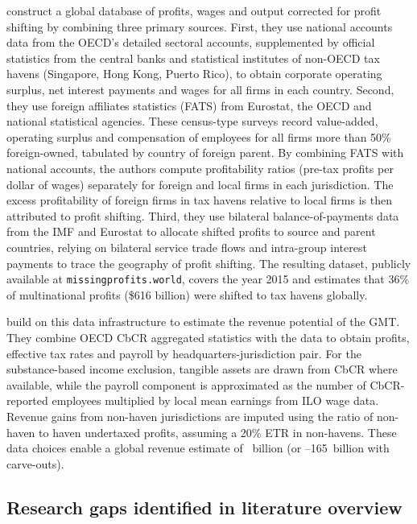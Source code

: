 \documentclass[11pt,a4paper]{article}
\newcommand{\EUR}{\texteuro}
\begin{document}
\citet{torslov2023} construct a global database of profits, wages and output corrected for profit shifting by combining three primary sources. First, they use national accounts data from the OECD's detailed sectoral accounts, supplemented by official statistics from the central banks and statistical institutes of non-OECD tax havens (Singapore, Hong Kong, Puerto Rico), to obtain corporate operating surplus, net interest payments and wages for all firms in each country. Second, they use foreign affiliates statistics (FATS) from Eurostat, the OECD and national statistical agencies. These census-type surveys record value-added, operating surplus and compensation of employees for all firms more than 50\% foreign-owned, tabulated by country of foreign parent. By combining FATS with national accounts, the authors compute profitability ratios (pre-tax profits per dollar of wages) separately for foreign and local firms in each jurisdiction. The excess profitability of foreign firms in tax havens relative to local firms is then attributed to profit shifting. Third, they use bilateral balance-of-payments data from the IMF and Eurostat to allocate shifted profits to source and parent countries, relying on bilateral service trade flows and intra-group interest payments to trace the geography of profit shifting. The resulting dataset, publicly available at \texttt{missingprofits.world}, covers the year 2015 and estimates that 36\% of multinational profits (\$616 billion) were shifted to tax havens globally.

\citet{barake2022} build on this data infrastructure to estimate the revenue potential of the GMT. They combine OECD CbCR aggregated statistics with the \citet{torslov2023} data to obtain profits, effective tax rates and payroll by headquarters-jurisdiction pair. For the substance-based income exclusion, tangible assets are drawn from CbCR where available, while the payroll component is approximated as the number of CbCR-reported employees multiplied by local mean earnings from ILO wage data. Revenue gains from non-haven jurisdictions are imputed using the ratio of non-haven to haven undertaxed profits, assuming a 20\% ETR in non-havens. These data choices enable a global revenue estimate of \EUR 179~billion (or \EUR 139--165~billion with carve-outs).

\subsection{Research gaps identified in literature overview}
\end{document}
